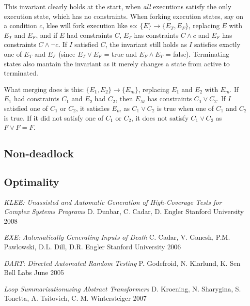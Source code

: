 \documentclass[12pt,a4paper]{article}
\begin{document}
This invariant clearly holds at the start, when \emph{all} executions satisfy the only execution state, which has no constraints. When forking execution states, say on a condition $c$, klee will fork execution like so: $\{E\} \rightarrow \{E_T, E_F\}$, replacing $E$ with $E_T$ and $E_F$, and if $E$ had constraints $C$, $E_T$ has constraints $C \wedge c$ and $E_F$ has constraints $C \wedge \neg c$. If $I$ satisfied $C$, the invariant still holds as $I$ satisfies exactly one of $E_T$ and $E_F$ (since $E_T \vee E_F$ = true and $E_F \wedge E_T$ = false). Terminating states also mantain the invariant as it merely changes a state from active to terminated.

What merging does is this: $\{E_1, E_2\} \rightarrow \{E_m\}$, replacing $E_1$ and $E_2$ with $E_m$. If $E_1$ had constraints $C_1$ and $E_2$ had $C_2$, then $E_M$ has constraints $C_1 \vee C_2$. If $I$ satisfied one of $C_1$ or $C_2$, it satisfies $E_m$ as $C_1 \vee C_2$ is true when one of $C_1$ and $C_2$ is true. If it did not satisfy one of $C_1$ or $C_2$, it does not satisfy $C_1 \vee C_2$ as $F \vee F = F$.

\subsection{Non-deadlock}

\subsection{Optimality}

\begin{thebibliography}{9}
         \emph{KLEE: Unassisted and Automatic Generation of High-Coverage Tests for Complex Systems Programs}
         D. Dunbar, C. Cadar, D. Engler
         Stanford University
         2008

          \emph{EXE: Automatically Generating Inputs of Death}
	  C. Cadar, V. Ganesh, P.M. Pawlowski, D.L. Dill, D.R. Engler
	  Stanford University
	  2006

         
          \emph{DART: Directed Automated Random Testing}
          P. Godefroid, N. Klarlund, K. Sen
	  Bell Labs
	  June 2005
	
        \emph{Loop Summarizationusing Abstract Transformers}
        D. Kroening, N. Sharygina, S. Tonetta, A. Tsitovich, C. M. Wintersteiger
        2007


\end{thebibliography}
\end{document}
